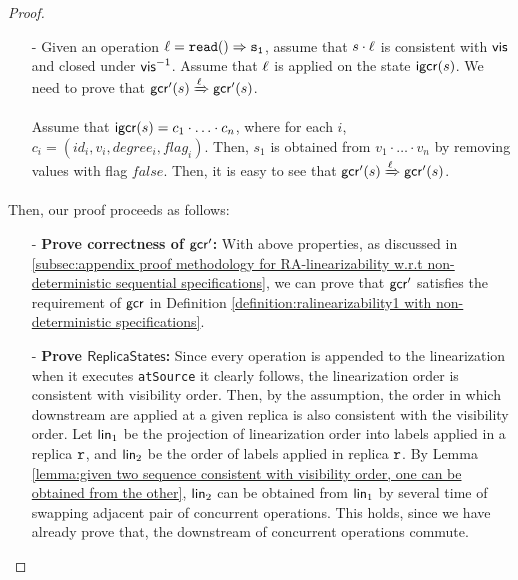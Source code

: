 {\begin {proof}
\begin{itemize}
\begin{itemize}
    \item[-] Given an operation $\alabel = \alabellong[{\tt read}]{}{s_1}{}$, assume that $s \cdot \ell$ is consistent with $\mathsf{vis}$ and closed under $\mathsf{vis}^{-1}$. Assume that $\ell$ is applied on the state $\mathsf{igcr}(s)$. We need to prove that $\mathsf{gcr}'(s)\xRightarrow{\ensuremath{\ell}}\mathsf{gcr}'(s)$.

        Assume that $\mathsf{igcr}(s)=c_1 \cdot \ldots \cdot c_n$, where for each $i$, $c_i = (id_i,v_i,degree_i,flag_i)$. Then, $s_1$ is obtained from $v_1 \cdot \ldots \cdot v_n$ by removing values with flag $\mathit{false}$. Then, it is easy to see that $\mathsf{gcr}'(s)\xRightarrow{\ensuremath{\ell}}\mathsf{gcr}'(s)$.
    \end{itemize}

\end{itemize}

Then, our proof proceeds as follows:

\begin{itemize}
\setlength{\itemsep}{0.5pt}
\item[-] {\bf Prove correctness of $\mathsf{gcr}'$:} With above properties, as discussed in \sectionautorefname \ref{subsec:appendix proof methodology for RA-linearizability w.r.t non-deterministic sequential specifications}, we can prove that $\mathsf{gcr}'$ satisfies the requirement of $\mathsf{gcr}$ in Definition \ref{definition:ralinearizability1 with non-deterministic specifications}.

\item[-] {\bf Prove $\mathsf{ReplicaStates}$:} Since every operation is appended to the linearization when it executes {\tt atSource} it clearly follows, the linearization order is consistent with visibility order. Then, by the {} assumption, the order in which downstream are applied at a given replica is also consistent with the visibility order. Let $\mathsf{lin}_1$ be the projection of linearization order into labels applied in a replica $\mathtt{r}$, and $\mathsf{lin}_2$ be the order of labels applied in replica $\mathtt{r}$. By Lemma \ref{lemma:given two sequence consistent with visibility order, one can be obtained from the other}, $\mathsf{lin}_2$ can be obtained from $\mathsf{lin}_1$ by several time of swapping adjacent pair of concurrent operations. This holds, since we have already prove that, the downstream of concurrent operations commute.


\end{itemize}
\end{proof}}
